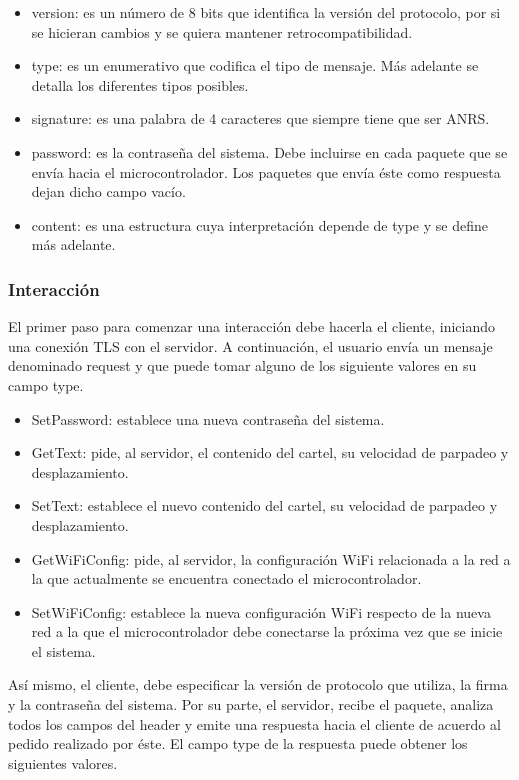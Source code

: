 \begin{itemize}
	\item version: es un número de 8 bits que identifica la versión del protocolo, por si se hicieran cambios y se quiera mantener retrocompatibilidad.
	\item type: es un enumerativo que codifica el tipo de mensaje. Más adelante se detalla los diferentes tipos posibles.
	\item signature: es una palabra de 4 caracteres que siempre tiene que ser ANRS.
	\item password: es la contraseña del sistema. Debe incluirse en cada paquete que se envía hacia el microcontrolador. Los paquetes que envía éste como respuesta dejan dicho campo vacío.
	\item content: es una estructura cuya interpretación depende de type y se define más adelante.
\end{itemize}



\subsubsection{Interacción}

El primer paso para comenzar una interacción debe hacerla el cliente, iniciando una conexión TLS con el servidor.
A continuación, el usuario envía un mensaje denominado request y que puede tomar alguno de los siguiente valores en su campo type.

\begin{itemize}
	\item SetPassword: establece una nueva contraseña del sistema.
	\item GetText: pide, al servidor, el contenido del cartel, su velocidad de parpadeo y desplazamiento.
	\item SetText: establece el nuevo contenido del cartel, su velocidad de parpadeo y desplazamiento.
	\item GetWiFiConfig: pide, al servidor, la configuración WiFi relacionada a la red a la que actualmente se encuentra conectado el microcontrolador.
	\item SetWiFiConfig: establece la nueva configuración WiFi respecto de la nueva red a la que el microcontrolador debe conectarse la próxima vez que se inicie el sistema.
\end{itemize}

Así mismo, el cliente, debe especificar la versión de protocolo que utiliza, la firma y la contraseña del sistema.
Por su parte, el servidor, recibe el paquete, analiza todos los campos del header y emite una respuesta hacia el cliente de acuerdo al pedido realizado por éste.
El campo type de la respuesta puede obtener los siguientes valores.

